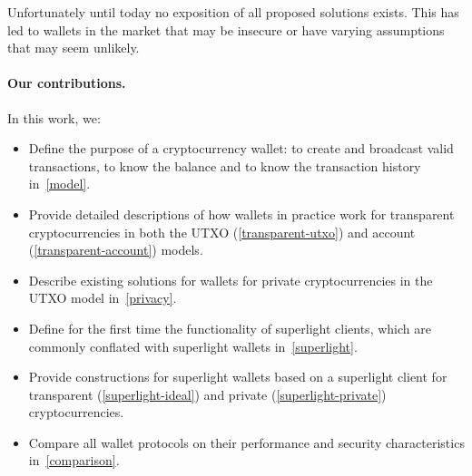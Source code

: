 Unfortunately until today no exposition of all proposed solutions exists. This has led to wallets in the market that may be insecure or have varying assumptions that may seem unlikely.

\paragraph{Our contributions.} In this work, we:
\begin{itemize}
    \item Define the purpose of a cryptocurrency wallet: to create and broadcast valid transactions, to know the balance and to know the transaction history in~\cref{model}.
    \item Provide detailed descriptions of how wallets in practice work for transparent cryptocurrencies in both the UTXO (\cref{transparent-utxo}) and account (\cref{transparent-account}) models.
    \item Describe existing solutions for wallets for private cryptocurrencies in the UTXO model in~\cref{privacy}.
    \item Define for the first time the functionality of superlight clients, which are commonly conflated with superlight wallets in~\cref{superlight}.
    \item Provide constructions for superlight wallets based on a superlight client for transparent (\cref{superlight-ideal}) and private (\cref{superlight-private}) cryptocurrencies.
    \item Compare all wallet protocols on their performance and security characteristics in~\cref{comparison}.
\end{itemize}
